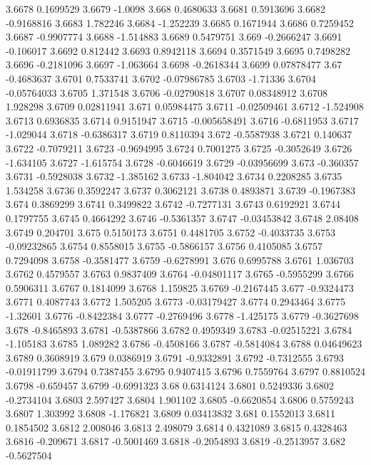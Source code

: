 3.6678  0.1699529
3.6679  -1.0098
3.668  0.4680633
3.6681  0.5913696
3.6682  -0.9168816
3.6683  1.782246
3.6684  -1.252239
3.6685  0.1671944
3.6686  0.7259452
3.6687  -0.9907774
3.6688  -1.514883
3.6689  0.5479751
3.669  -0.2666247
3.6691  -0.106017
3.6692  0.812442
3.6693  0.8942118
3.6694  0.3571549
3.6695  0.7498282
3.6696  -0.2181096
3.6697  -1.063664
3.6698  -0.2618344
3.6699  0.07878477
3.67  -0.4683637
3.6701  0.7533741
3.6702  -0.07986785
3.6703  -1.71336
3.6704  -0.05764033
3.6705  1.371548
3.6706  -0.02790818
3.6707  0.08348912
3.6708  1.928298
3.6709  0.02811941
3.671  0.05984475
3.6711  -0.02509461
3.6712  -1.524908
3.6713  0.6936835
3.6714  0.9151947
3.6715  -0.005658491
3.6716  -0.6811953
3.6717  -1.029044
3.6718  -0.6386317
3.6719  0.8110394
3.672  -0.5587938
3.6721  0.140637
3.6722  -0.7079211
3.6723  -0.9694995
3.6724  0.7001275
3.6725  -0.3052649
3.6726  -1.634105
3.6727  -1.615754
3.6728  -0.6046619
3.6729  -0.03956699
3.673  -0.360357
3.6731  -0.5928038
3.6732  -1.385162
3.6733  -1.804042
3.6734  0.2208285
3.6735  1.534258
3.6736  0.3592247
3.6737  0.3062121
3.6738  0.4893871
3.6739  -0.1967383
3.674  0.3869299
3.6741  0.3499822
3.6742  -0.7277131
3.6743  0.6192921
3.6744  0.1797755
3.6745  0.4664292
3.6746  -0.5361357
3.6747  -0.03453842
3.6748  2.08408
3.6749  0.204701
3.675  0.5150173
3.6751  0.4481705
3.6752  -0.4033735
3.6753  -0.09232865
3.6754  0.8558015
3.6755  -0.5866157
3.6756  0.4105085
3.6757  0.7294098
3.6758  -0.3581477
3.6759  -0.6278991
3.676  0.6995788
3.6761  1.036703
3.6762  0.4579557
3.6763  0.9837409
3.6764  -0.04801117
3.6765  -0.5955299
3.6766  0.5906311
3.6767  0.1814099
3.6768  1.159825
3.6769  -0.2167445
3.677  -0.9324473
3.6771  0.4087743
3.6772  1.505205
3.6773  -0.03179427
3.6774  0.2943464
3.6775  -1.32601
3.6776  -0.8422384
3.6777  -0.2769496
3.6778  -1.425175
3.6779  -0.3627698
3.678  -0.8465893
3.6781  -0.5387866
3.6782  0.4959349
3.6783  -0.02515221
3.6784  -1.105183
3.6785  1.089282
3.6786  -0.4508166
3.6787  -0.5814084
3.6788  0.04649623
3.6789  0.3608919
3.679  0.0386919
3.6791  -0.9332891
3.6792  -0.7312555
3.6793  -0.01911799
3.6794  0.7387455
3.6795  0.9407415
3.6796  0.7559764
3.6797  0.8810524
3.6798  -0.659457
3.6799  -0.6991323
3.68  0.6314124
3.6801  0.5249336
3.6802  -0.2734104
3.6803  2.597427
3.6804  1.901102
3.6805  -0.6620854
3.6806  0.5759243
3.6807  1.303992
3.6808  -1.176821
3.6809  0.03413832
3.681  0.1552013
3.6811  0.1854502
3.6812  2.008046
3.6813  2.498079
3.6814  0.4321089
3.6815  0.4328463
3.6816  -0.209671
3.6817  -0.5001469
3.6818  -0.2054893
3.6819  -0.2513957
3.682  -0.5627504

